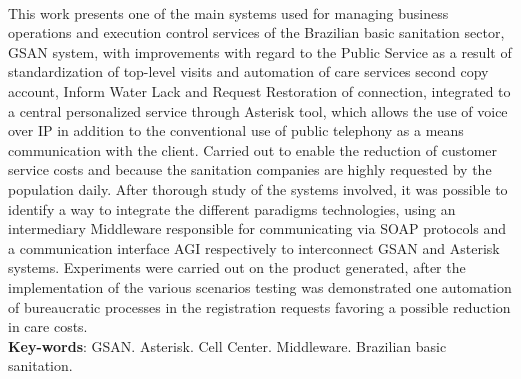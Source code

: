 \begin{description}
\item {}\\[1.5cm]
\raggedright{This work presents one of the main systems used for managing business operations and execution control services of the Brazilian basic sanitation sector, GSAN system, with improvements with regard to the Public Service as a result of standardization of top-level visits and automation of care services second copy account, Inform Water Lack and Request Restoration of connection, integrated to a central personalized service through Asterisk tool, which allows the use of voice over IP in addition to the conventional use of public telephony as a means communication with the client. Carried out to enable the reduction of customer service costs and because the sanitation companies are highly requested by the population daily. After thorough study of the systems involved, it was possible to identify a way to integrate the different paradigms technologies, using an intermediary Middleware responsible for communicating via SOAP protocols and a communication interface AGI respectively to interconnect GSAN and Asterisk systems. Experiments were carried out on the product generated, after the implementation of the various scenarios testing was demonstrated one automation of bureaucratic processes in the registration requests favoring a possible reduction in care costs.}\\
\textbf{Key-words}: GSAN. Asterisk. Cell Center. Middleware. Brazilian basic sanitation.
\end{description}